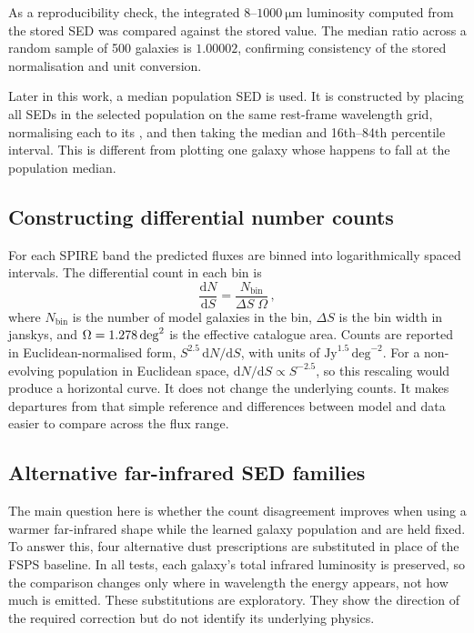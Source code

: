\documentclass[12pt,a4paper]{article}
\begin{document}
As a reproducibility check, the integrated $8$--$\SI{1000}{\um}$ luminosity computed
from the stored SED was compared against the stored \LIR{} value. The median ratio
across a random sample of 500 galaxies is $1.00002$, confirming  consistency of
the stored normalisation and unit conversion.


  Later in this work, a median population SED is used. It is constructed by placing
all SEDs in the selected population on the same rest-frame wavelength grid, normalising
each to its \LIR{}, and then taking the median and 16th--84th percentile
  interval. This is different from plotting one galaxy whose \LIR{} happens to fall at the
  population median.

\subsection{Constructing differential number counts}
\label{sec:methods:counts}

For each SPIRE band the predicted fluxes are binned into logarithmically spaced
intervals. The differential count in each bin is
\begin{equation}
  \frac{\mathrm{d}N}{\mathrm{d}S} = \frac{N_\mathrm{bin}}{\Delta S \;\Omega}\,,
\end{equation}
where $N_\mathrm{bin}$ is the number of model galaxies in the bin, $\Delta S$ is the
bin width in janskys, and $\Omega = \SI{1.278}{\deg\squared}$ is the effective catalogue
area. Counts are reported in Euclidean-normalised form,
$S^{2.5}\,\mathrm{d}N/\mathrm{d}S$, with units of
$\mathrm{Jy}^{1.5}\,\mathrm{deg}^{-2}$. For a non-evolving population in Euclidean
space, $\mathrm{d}N/\mathrm{d}S\propto S^{-2.5}$, so this rescaling would produce a
horizontal curve. It does not change the underlying counts. It makes departures from
that simple reference and differences between model and data easier to compare across
the flux range.

\subsection{Alternative far-infrared SED families}
\label{sec:methods:templates}

The main question here is whether the count disagreement improves when using a warmer far-infrared
shape while the learned galaxy population and \LIR{} are held fixed. To answer this, four
  alternative dust prescriptions are substituted in place of the FSPS baseline. In all
  tests, each galaxy's total infrared luminosity is preserved, so the
comparison changes only where in wavelength the energy appears, not how much is emitted.
These substitutions are exploratory. They show the direction of the required correction
but do not identify its underlying physics.
\end{document}
